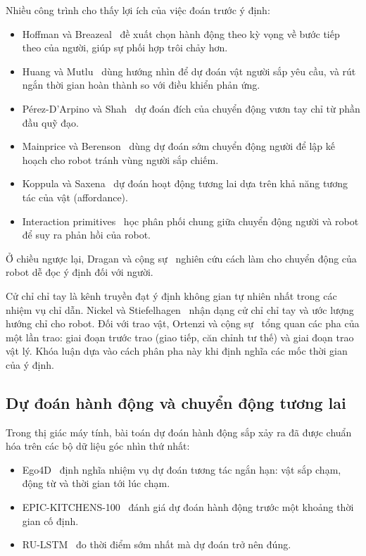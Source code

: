 Nhiều công trình cho thấy lợi ích của việc đoán trước ý định:
\begin{itemize}
  \item Hoffman và Breazeal~\cite{hoffman2007cost} đề xuất chọn hành động theo kỳ vọng về bước tiếp theo của người, giúp sự phối hợp trôi chảy hơn.
  \item Huang và Mutlu~\cite{huang2016anticipatory} dùng hướng nhìn để dự đoán vật người sắp yêu cầu, và rút ngắn thời gian hoàn thành so với điều khiển phản ứng.
  \item Pérez-D'Arpino và Shah~\cite{perezdarpino2015fast} dự đoán đích của chuyển động vươn tay chỉ từ phần đầu quỹ đạo.
  \item Mainprice và Berenson~\cite{mainprice2013human} dùng dự đoán sớm chuyển động người để lập kế hoạch cho robot tránh vùng người sắp chiếm.
  \item Koppula và Saxena~\cite{koppula2016anticipating} dự đoán hoạt động tương lai dựa trên khả năng tương tác của vật (affordance).
  \item Interaction primitives~\cite{amor2014interaction} học phân phối chung giữa chuyển động người và robot để suy ra phản hồi của robot.
\end{itemize}

Ở chiều ngược lại, Dragan và cộng sự~\cite{dragan2013legibility} nghiên cứu cách làm cho chuyển động của robot dễ đọc ý định đối với người.

Cử chỉ chỉ tay là kênh truyền đạt ý định không gian tự nhiên nhất trong các nhiệm vụ chỉ dẫn. Nickel và Stiefelhagen~\cite{nickel2007pointing} nhận dạng cử chỉ chỉ tay và ước lượng hướng chỉ cho robot. Đối với trao vật, Ortenzi và cộng sự~\cite{ortenzi2021handovers} tổng quan các pha của một lần trao: giai đoạn trước trao (giao tiếp, căn chỉnh tư thế) và giai đoạn trao vật lý. Khóa luận dựa vào cách phân pha này khi định nghĩa các mốc thời gian của ý định.

\subsection{Dự đoán hành động và chuyển động tương lai}

Trong thị giác máy tính, bài toán dự đoán hành động sắp xảy ra đã được chuẩn hóa trên các bộ dữ liệu góc nhìn thứ nhất:
\begin{itemize}
  \item Ego4D~\cite{grauman2022ego4d} định nghĩa nhiệm vụ dự đoán tương tác ngắn hạn: vật sắp chạm, động từ và thời gian tới lúc chạm.
  \item EPIC-KITCHENS-100~\cite{damen2022epic} đánh giá dự đoán hành động trước một khoảng thời gian cố định.
  \item RU-LSTM~\cite{furnari2021rulstm} đo thời điểm sớm nhất mà dự đoán trở nên đúng.
\end{itemize}

